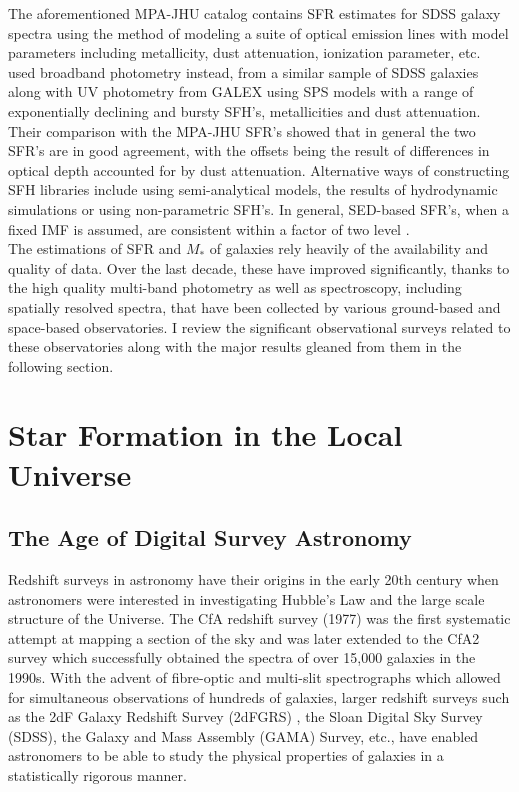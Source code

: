 The aforementioned MPA-JHU catalog contains SFR estimates for SDSS galaxy spectra using the \citet{brinchmann_physical_2004} method of modeling a suite of optical emission lines with model parameters including metallicity, dust attenuation, ionization parameter, etc. \citet{salim_uv_2007} used broadband photometry instead, from a similar sample of SDSS galaxies along with UV photometry from GALEX using SPS models with a range of exponentially declining and bursty SFH's, metallicities and dust attenuation. Their comparison with the MPA-JHU SFR's showed that in general the two SFR's are in good agreement, with the offsets being the result of differences in optical depth accounted for by dust attenuation. Alternative ways of constructing SFH libraries include using semi-analytical models, the results of hydrodynamic simulations or using non-parametric SFH's. In general, SED-based SFR's, when a fixed IMF is assumed, are consistent within a factor of two level \citep{conroy_modeling_2013}.\\

The estimations of SFR and $M_{*}$ of galaxies rely heavily of the availability and quality of data. Over the last decade, these have improved significantly, thanks to the high quality multi-band photometry as well as spectroscopy, including spatially resolved spectra, that have been collected by various ground-based and space-based observatories. I review the significant observational surveys related to these observatories along with the major results gleaned from them in the following section.\\

\section{Star Formation in the Local Universe}

\subsection{The Age of Digital Survey Astronomy}

Redshift surveys in astronomy have their origins in the early 20th century when astronomers were interested in investigating Hubble's Law and the large scale structure of the Universe. The CfA redshift survey (1977) was the first systematic attempt at mapping a section of the sky and was later extended to the CfA2 survey which successfully obtained the spectra of over 15,000 galaxies in the 1990s. With the advent of fibre-optic and multi-slit spectrographs which allowed for simultaneous observations of hundreds of galaxies, larger redshift surveys such as the 2dF Galaxy Redshift Survey (2dFGRS) , the Sloan Digital Sky Survey (SDSS), the Galaxy and Mass Assembly (GAMA) Survey, etc., have enabled astronomers to be able to study the physical properties of galaxies in a statistically rigorous manner.\\

